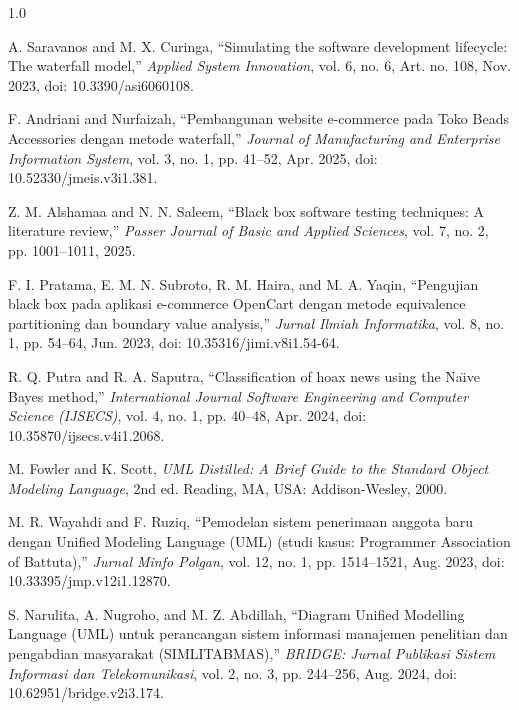 \documentclass[12pt,a4paper,twoside]{report}
\begin{document}
\begin{spacing}{1.0}
\begin{enumerate}[label={[\arabic*]},leftmargin=0.9cm,itemsep=5pt,topsep=2pt]
  \item A. Saravanos and M. X. Curinga, ``Simulating the software development lifecycle: The waterfall model,'' \textit{Applied System Innovation}, vol. 6, no. 6, Art. no. 108, Nov. 2023, doi: 10.3390/asi6060108.

  \item F. Andriani and Nurfaizah, ``Pembangunan website e-commerce pada Toko Beads Accessories dengan metode waterfall,'' \textit{Journal of Manufacturing and Enterprise Information System}, vol. 3, no. 1, pp. 41--52, Apr. 2025, doi: 10.52330/jmeis.v3i1.381.

  \item Z. M. Alshamaa and N. N. Saleem, ``Black box software testing techniques: A literature review,'' \textit{Passer Journal of Basic and Applied Sciences}, vol. 7, no. 2, pp. 1001--1011, 2025.

  \item F. I. Pratama, E. M. N. Subroto, R. M. Haira, and M. A. Yaqin, ``Pengujian black box pada aplikasi e-commerce OpenCart dengan metode equivalence partitioning dan boundary value analysis,'' \textit{Jurnal Ilmiah Informatika}, vol. 8, no. 1, pp. 54--64, Jun. 2023, doi: 10.35316/jimi.v8i1.54-64.

  \item R. Q. Putra and R. A. Saputra, ``Classification of hoax news using the Na\"{\i}ve Bayes method,'' \textit{International Journal Software Engineering and Computer Science (IJSECS)}, vol. 4, no. 1, pp. 40--48, Apr. 2024, doi: 10.35870/ijsecs.v4i1.2068.

  \item M. Fowler and K. Scott, \textit{UML Distilled: A Brief Guide to the Standard Object Modeling Language}, 2nd ed. Reading, MA, USA: Addison-Wesley, 2000.

  \item M. R. Wayahdi and F. Ruziq, ``Pemodelan sistem penerimaan anggota baru dengan Unified Modeling Language (UML) (studi kasus: Programmer Association of Battuta),'' \textit{Jurnal Minfo Polgan}, vol. 12, no. 1, pp. 1514--1521, Aug. 2023, doi: 10.33395/jmp.v12i1.12870.

  \item S. Narulita, A. Nugroho, and M. Z. Abdillah, ``Diagram Unified Modelling Language (UML) untuk perancangan sistem informasi manajemen penelitian dan pengabdian masyarakat (SIMLITABMAS),'' \textit{BRIDGE: Jurnal Publikasi Sistem Informasi dan Telekomunikasi}, vol. 2, no. 3, pp. 244--256, Aug. 2024, doi: 10.62951/bridge.v2i3.174.


\end{enumerate}
\end{spacing}
\end{document}
